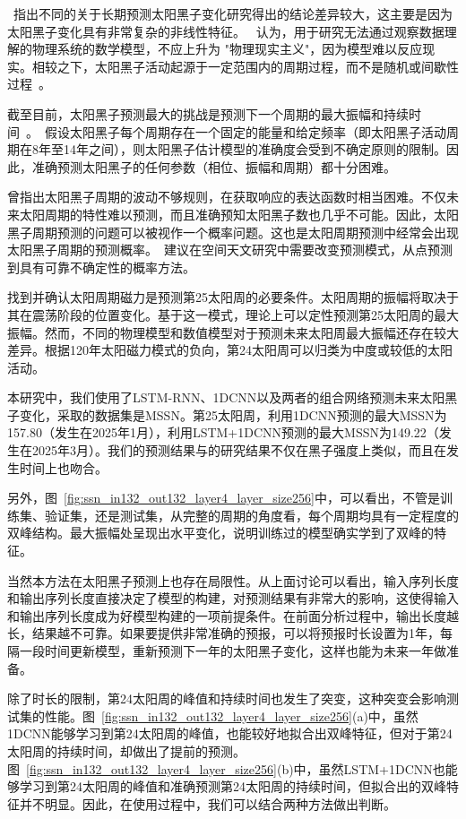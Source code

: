 ~\citet{solanki2011analyzing}指出不同的关于长期预测太阳黑子变化研究得出的结论差异较大，这主要是因为太阳黑子变化具有非常复杂的非线性特征。 ~\citet{charbonneau2010dynamo}认为，用于研究无法通过观察数据理解的物理系统的数学模型，不应上升为 "物理现实主义"，因为模型难以反应现实。相较之下，太阳黑子活动起源于一定范围内的周期过程，而不是随机或间歇性过程~\citep{mendoza2011mid}。

截至目前，太阳黑子预测最大的挑战是预测下一个周期的最大振幅和持续时间~\citep{petrovay2010solar}。~\citet{herrera2015reconstruction}假设太阳黑子每个周期存在一个固定的能量和给定频率（即太阳黑子活动周期在8年至14年之间），则太阳黑子估计模型的准确度会受到不确定原则的限制。因此，准确预测太阳黑子的任何参数（相位、振幅和周期）都十分困难。

\citet{gleissberg1939long}曾指出太阳黑子周期的波动不够规则，在获取响应的表达函数时相当困难。不仅未来太阳周期的特性难以预测，而且准确预知太阳黑子数也几乎不可能。因此，太阳黑子周期预测的问题可以被视作一个概率问题。这也是太阳周期预测中经常会出现太阳黑子周期的预测概率。~\citet{camporeale2019challenge}建议在空间天文研究中需要改变预测模式，从点预测到具有可靠不确定性的概率方法。

找到并确认太阳周期磁力是预测第25太阳周的必要条件。太阳周期的振幅将取决于其在震荡阶段的位置变化。基于这一模式，理论上可以定性预测第25太阳周的最大振幅。然而，不同的物理模型和数值模型对于预测未来太阳周最大振幅还存在较大差异。根据120年太阳磁力模式的负向，第24太阳周可以归类为中度或较低的太阳活动。

本研究中，我们使用了LSTM-RNN、1DCNN以及两者的组合网络预测未来太阳黑子变化，采取的数据集是MSSN。第25太阳周，利用1DCNN预测的最大MSSN为157.80（发生在2025年1月），利用LSTM+1DCNN预测的最大MSSN为149.22（发生在2025年3月）。我们的预测结果与\citet{covas2019neural}的研究结果不仅在黑子强度上类似，而且在发生时间上也吻合。

另外，图~\ref{fig:ssn_in132_out132_layer4_layer_size256}中，可以看出，不管是训练集、验证集，还是测试集，从完整的周期的角度看，每个周期均具有一定程度的双峰结构。最大振幅处呈现出水平变化，说明训练过的模型确实学到了双峰的特征。

当然本方法在太阳黑子预测上也存在局限性。从上面讨论可以看出，输入序列长度和输出序列长度直接决定了模型的构建，对预测结果有非常大的影响，这使得输入和输出序列长度成为好模型构建的一项前提条件。在前面分析过程中，输出长度越长，结果越不可靠。如果要提供非常准确的预报，可以将预报时长设置为1年，每隔一段时间更新模型，重新预测下一年的太阳黑子变化，这样也能为未来一年做准备。

除了时长的限制，第24太阳周的峰值和持续时间也发生了突变，这种突变会影响测试集的性能。图~\ref{fig:ssn_in132_out132_layer4_layer_size256}(a)中，虽然1DCNN能够学习到第24太阳周的峰值，也能较好地拟合出双峰特征，但对于第24太阳周的持续时间，却做出了提前的预测。图~\ref{fig:ssn_in132_out132_layer4_layer_size256}(b)中，虽然LSTM+1DCNN也能够学习到第24太阳周的峰值和准确预测第24太阳周的持续时间，但拟合出的双峰特征并不明显。因此，在使用过程中，我们可以结合两种方法做出判断。

